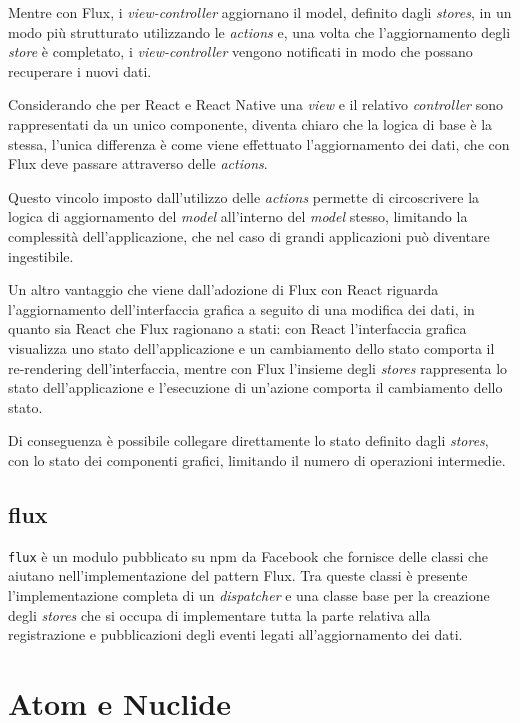 Mentre con Flux, i \textit{view-controller} aggiornano il model, definito dagli \textit{stores}, in un modo più strutturato utilizzando le \textit{actions} e, una volta che l'aggiornamento degli \textit{store} è completato, i \textit{view-controller} vengono notificati in modo che possano recuperare i nuovi dati.

Considerando che per React e React Native una \textit{view} e il relativo \textit{controller} sono rappresentati da un unico componente, diventa chiaro che la logica di base è la stessa, l'unica differenza è come viene effettuato l'aggiornamento dei dati, che con Flux deve passare attraverso delle \textit{actions}.

Questo vincolo imposto dall'utilizzo delle \textit{actions} permette di circoscrivere la logica di aggiornamento del \textit{model} all'interno del \textit{model} stesso, limitando la complessità dell'applicazione, che nel caso di grandi applicazioni può diventare ingestibile.

Un altro vantaggio che viene dall'adozione di Flux con React riguarda l'aggiornamento dell'interfaccia grafica a seguito di una modifica dei dati, in quanto sia React che Flux ragionano a stati: con React l'interfaccia grafica visualizza uno stato dell'applicazione e un cambiamento dello stato comporta il re-rendering dell'interfaccia, mentre con Flux l'insieme degli \textit{stores} rappresenta lo stato dell'applicazione e l'esecuzione di un'azione comporta il cambiamento dello stato.

Di conseguenza è possibile collegare direttamente lo stato definito dagli \textit{stores}, con lo stato dei componenti grafici, limitando il numero di operazioni intermedie.

\subsection{flux}\label{sec:flux-npm}

\texttt{flux} è un modulo pubblicato su npm da Facebook che fornisce delle classi che aiutano nell'implementazione del pattern Flux.
Tra queste classi è presente l'implementazione completa di un \textit{dispatcher} e una classe base per la creazione degli \textit{stores} che si occupa di implementare tutta la parte relativa alla registrazione e pubblicazioni degli eventi legati all'aggiornamento dei dati.


\section{Atom e Nuclide}


